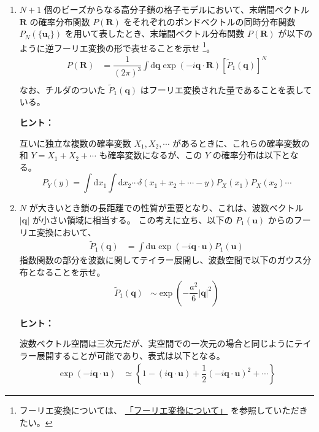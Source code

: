 \documentclass[uplatex,dvipdfmx,a4paper,11pt]{jsarticle}
\newcommand{\diff}{\mathrm d}
\begin{document}
\begin{enumerate}
\setlength{\parskip}{0cm} %
\setlength{\itemsep}{0.5cm} %

\item
$N+1$ 個のビーズからなる高分子鎖の格子モデルにおいて、末端間ベクトル $\bm{R}$ の確率分布関数 $P(\bm{R})$ をそれぞれのボンドベクトルの同時分布関数 $P_N(\{\bm{u}_i\})$ を用いて表したとき、末端間ベクトル分布関数 $P(\bm{R})$ が以下のように逆フーリエ変換の形で表せることを示せ
\footnote
{
フーリエ変換については、
\href{https://dl.dropboxusercontent.com/u/18899343/Math/Fourier_Transform_2014_0321.pdf}{「フーリエ変換について」}
を参照していただきたい。
}。
\begin{align*}
P(\bm{R}) 
	&= \dfrac{1}{(2 \pi)^3} \int \diff \bm{q} \exp \left( -i \bm{q} \cdot \bm{R} \right) \left[\tilde{P}_1 (\bm{q}) \right]^N \\
\end{align*}
なお、チルダのついた $\tilde{P}_1 (\bm{q})$ はフーリエ変換された量であることを表している。

\begin{itembox}[l]{{\bf ヒント：}}

互いに独立な複数の確率変数 $X_1, X_2, \cdots$ があるときに、これらの確率変数の和 $Y=X_1 + X_2 + \cdots$ も確率変数になるが、この $Y$ の確率分布は以下となる。
\begin{equation*}
P_Y(y) = \int \diff x_1 \int \diff x_2 \cdots \delta (x_1 + x_2 + \cdots -y) P_X(x_1) P_X(x_2) \cdots
\end{equation*}
\end{itembox}

\item
$N$ が大きいとき鎖の長距離での性質が重要となり、これは、波数ベクトル $|\bm{q}|$ が小さい領域に相当する。
この考えに立ち、以下の $P_1 (\bm{u})$ からのフーリエ変換において、
\begin{align*}
\tilde{P}_1 (\bm{q}) 
	&= \int \diff \bm{u} \exp(- i\bm{q} \cdot \bm{u} ) P_1 (\bm{u})
\end{align*}
指数関数の部分を波数に関してテイラー展開し、波数空間で以下のガウス分布となることを示せ。
\begin{align*}
\tilde{P}_1 (\bm{q}) 
	&\sim \exp \left( - \dfrac{a^2}{6} |\bm{q}|^2 \right)
\end{align*}

\begin{itembox}[l]{{\bf ヒント：}}

波数ベクトル空間は三次元だが、実空間での一次元の場合と同じようにテイラー展開することが可能であり、表式は以下となる。
\begin{align*}
\exp(- i\bm{q} \cdot \bm{u} )
	&\simeq \left \{ 1-( i \bm{q} \cdot \bm{u} ) +\dfrac{1}{2} (-i \bm{q} \cdot \bm{u})^2 + \cdots \right\} 
\end{align*}


\end{itembox}
\end{enumerate}
\end{document}
